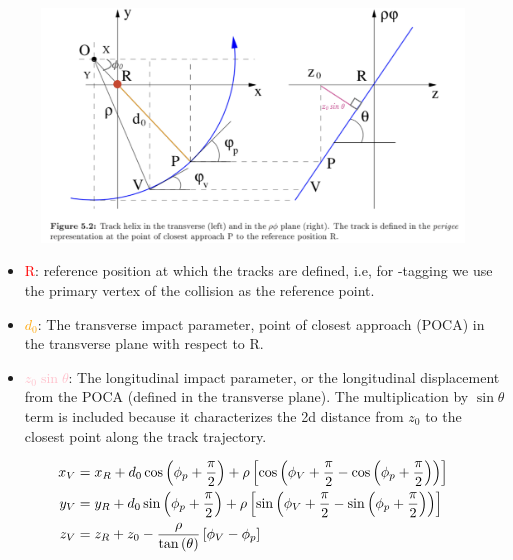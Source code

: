 \begin{figure}[hbt]
\includegraphics[width=\textwidth]{figures/cp-graphics/giacinto-fig-5.2}
\caption{\cite{giacinto-thesis}}
\label{fig:track-2d-graphics}
\end{figure}

\begin{itemize}
	\item \textcolor{red}{R}: reference position at which the tracks are defined, i.e, for \Pqb-tagging we use the primary vertex of the collision as the reference point. 
	\item \textcolor{orange}{$d_0$}:  The transverse impact parameter, point of closest approach (POCA) in the transverse plane with respect to R.
	\item \textcolor{pink}{$z_0 \sin \theta$}:  The longitudinal impact parameter, or the longitudinal displacement from the POCA (defined in the transverse plane). The multiplication by $\sin \theta$ term is included because it characterizes the 2d distance from $z_0$ to the closest point along the track trajectory.
\end{itemize}


\begin{align}
x_V &= x_R + d_0 \cos \left( \phi_p + \frac{\pi}{2} \right)+ \rho \left[  \cos \left( \phi_V + \frac{\pi}{2}  -  \cos \left( \phi_p + \frac{\pi}{2} \right)\right)  \right] \notag \\
y_V &= y_R + d_0 \sin \left( \phi_p + \frac{\pi}{2} \right)+ \rho \left[  \sin \left( \phi_V + \frac{\pi}{2}  -  \sin \left( \phi_p + \frac{\pi}{2} \right)\right)  \right] \\
z_V &= z_R + z_0 - \frac{\rho}{\tan \left( \theta \right) } \left[ \phi_V - \phi_p \right] \notag
\end{align}

